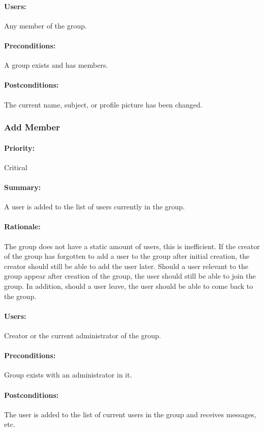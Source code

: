 \documentclass[11pt]{article}
\begin{document}
\paragraph{Users:}
Any member of the group.
\paragraph{Preconditions:}
A group exists and has members.
\paragraph{{Postconditions:}}
The current name, subject, or profile picture has been changed.

\subsubsection{Add Member} \label{UC-add-member}
\paragraph{Priority:} Critical
\paragraph{Summary:}
A user is added to the list of users currently in the group.
\paragraph{Rationale:}
The group does not have a static amount of users, this is inefficient. If the creator of the group has forgotten to add a user to the group after initial creation, the creator should still be able to add the user later. Should a user relevant to the group appear after creation of the group, the user should still be able to join the group. In addition, should a user leave, the user should be able to come back to the group.
\paragraph{Users:}
Creator or the current administrator of the group.
\paragraph{Preconditions:}
Group exists with an administrator in it.
\paragraph{{Postconditions:}}
The user is added to the list of current users in the group and receives messages, etc.
\end{document}
